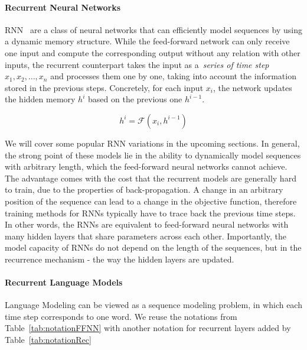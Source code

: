 \paragraph{Recurrent Neural Networks} RNN~\cite{elman1990finding} are a class of neural networks that can efficiently model sequences by using a dynamic memory structure. While the feed-forward network can only receive one input and compute the corresponding output without any relation with other inputs, the recurrent counterpart takes the input as a~\textit{series of time step}  $x_1, x_2, \dots, x_n$ and processes them one by one, taking into account the information stored in the previous steps. Concretely, for each input $x_i$, the network updates the hidden memory $h^i$ based on the previous one $h^{i-1}$. 


\begin{equation}
h^i = \mathcal{F}(x_i, h^{i-1})
\end{equation}

We will cover some popular RNN variations in the upcoming sections. In general, the strong point of these models lie in the ability to dynamically model sequences with arbitrary length, which the feed-forward neural networks cannot achieve. The advantage comes with the cost that the recurrent models are generally hard to train, due to the properties of back-propagation. A change in an arbitrary position of the sequence can lead to a change in the objective function, therefore training methods for RNNs typically have to trace back the previous time steps. In other words, the RNNs are equivalent to feed-forward neural networks with many hidden layers that share parameters across each other. Importantly, the model capacity of RNNs do not depend on the length of the sequences, but in the recurrence mechanism - the way the hidden layers are updated. 

\paragraph{Recurrent Language Models} Language Modeling can be viewed as a sequence modeling problem, in which each time step corresponds to one word. We reuse the notations from Table~\ref{tab:notationFFNN} with another notation for recurrent layers added by Table~\ref{tab:notationRec}

